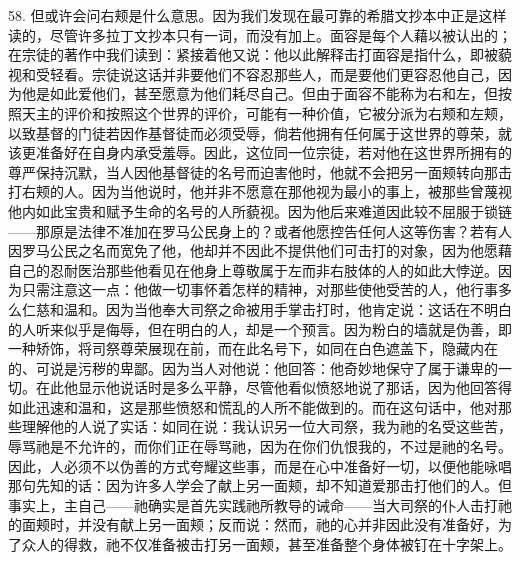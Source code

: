 58. 但或许会问右颊是什么意思。因为我们发现在最可靠的希腊文抄本中正是这样读的，尽管许多拉丁文抄本只有一词，而没有加上。面容是每个人藉以被认出的；在宗徒的著作中我们读到：紧接着他又说：他以此解释击打面容是指什么，即被藐视和受轻看。宗徒说这话并非要他们不容忍那些人，而是要他们更容忍他自己，因为他是如此爱他们，甚至愿意为他们耗尽自己。但由于面容不能称为右和左，但按照天主的评价和按照这个世界的评价，可能有一种价值，它被分派为右颊和左颊，以致基督的门徒若因作基督徒而必须受辱，倘若他拥有任何属于这世界的尊荣，就该更准备好在自身内承受羞辱。因此，这位同一位宗徒，若对他在这世界所拥有的尊严保持沉默，当人因他基督徒的名号而迫害他时，他就不会把另一面颊转向那击打右颊的人。因为当他说时，他并非不愿意在那他视为最小的事上，被那些曾蔑视他内如此宝贵和赋予生命的名号的人所藐视。因为他后来难道因此较不屈服于锁链——那原是法律不准加在罗马公民身上的？或者他愿控告任何人这等伤害？若有人因罗马公民之名而宽免了他，他却并不因此不提供他们可击打的对象，因为他愿藉自己的忍耐医治那些他看见在他身上尊敬属于左而非右肢体的人的如此大悖逆。因为只需注意这一点：他做一切事怀着怎样的精神，对那些使他受苦的人，他行事多么仁慈和温和。因为当他奉大司祭之命被用手掌击打时，他肯定说：这话在不明白的人听来似乎是侮辱，但在明白的人，却是一个预言。因为粉白的墙就是伪善，即一种矫饰，将司祭尊荣展现在前，而在此名号下，如同在白色遮盖下，隐藏内在的、可说是污秽的卑鄙。因为当人对他说：他回答：他奇妙地保守了属于谦卑的一切。在此他显示他说话时是多么平静，尽管他看似愤怒地说了那话，因为他回答得如此迅速和温和，这是那些愤怒和慌乱的人所不能做到的。而在这句话中，他对那些理解他的人说了实话：如同在说：我认识另一位大司祭，我为祂的名受这些苦，辱骂祂是不允许的，而你们正在辱骂祂，因为在你们仇恨我的，不过是祂的名号。因此，人必须不以伪善的方式夸耀这些事，而是在心中准备好一切，以便他能咏唱那句先知的话：因为许多人学会了献上另一面颊，却不知道爱那击打他们的人。但事实上，主自己——祂确实是首先实践祂所教导的诫命——当大司祭的仆人击打祂的面颊时，并没有献上另一面颊；反而说：然而，祂的心并非因此没有准备好，为了众人的得救，祂不仅准备被击打另一面颊，甚至准备整个身体被钉在十字架上。\par

